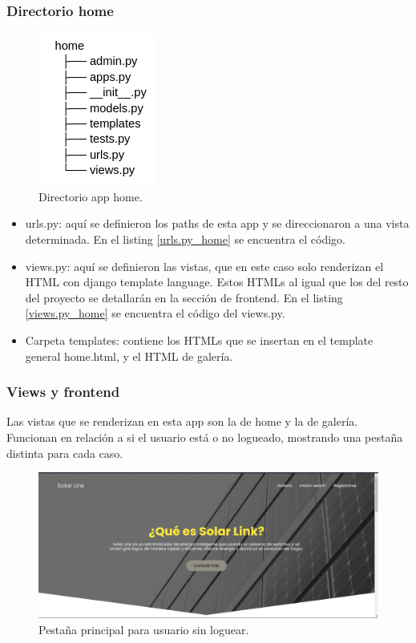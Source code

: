 \subsubsection{Directorio home}
\begin{figure}[H]
    \centering
    \includegraphics[width=0.25\linewidth]{web/Captura desde 2023-10-16 23-06-46.png}
    \caption{Directorio app home.}
    \label{fig:home-dir}
\end{figure}
\begin{itemize}
    \item urls.py: aquí se definieron los paths de esta app y se direccionaron a una vista determinada. En el listing \ref{urls.py_home} se encuentra el código.
    \item views.py: aquí se definieron las vistas, que en este caso solo renderizan el HTML con django template language. Estos HTMLs al igual que los del resto del proyecto se detallarán en la sección de frontend. En el listing \ref{views.py_home} se encuentra el código del views.py.
    \item Carpeta templates: contiene los HTMLs que se insertan en el template general home.html, y el HTML de galería.
\end{itemize}

\subsubsection{Views y frontend}

Las vistas que se renderizan en esta app son la de home y la de galería. Funcionan en relación a si el usuario está o no logueado, mostrando una pestaña distinta para cada caso.\\

\begin{figure}[H]
    \centering
    \includegraphics[width=1\linewidth]{web/Captura desde 2023-10-15 22-37-16.png}
    \caption{Pestaña principal para usuario sin loguear.}
    \label{fig:user-no-log}
\end{figure}

